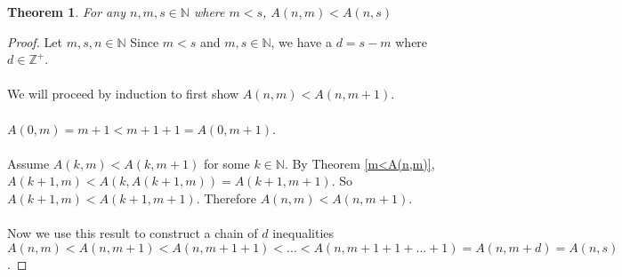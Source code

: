 \documentclass[12pt, letterpaper]{article}
\newtheorem{theorem}{Theorem}
\theoremstyle{case}
\begin{document}
    \begin{theorem}
      \label{a(n,m)<a(n,s)}
      For any $n, m, s \in \mathbb{N}$ where $m < s$, $A(n, m) < A(n, s)$
    \end{theorem}
    \begin{proof}
      Let $m, s, n \in \mathbb{N}$
      Since $m < s$ and $m, s \in \mathbb{N}$, we have a $d = s - m$ where $d \in \mathbb{Z}^+$.
      \\
      \\
      We will proceed by induction to first show $A(n, m) < A(n, m + 1)$.
      \\
      \\
      $A(0, m) = m + 1 < m + 1 + 1 = A(0, m + 1)$.
      \\
      \\
      Assume $A(k, m) < A(k, m + 1)$ for some $k \in \mathbb{N}$.
      By Theorem \ref{m<A(n,m)}, $A(k + 1, m) < A(k, A(k + 1, m)) = A(k + 1, m + 1)$.
      So $A(k + 1, m) < A(k + 1, m + 1)$.
      Therefore $A(n, m) < A(n, m + 1)$.
      \\
      \\
      Now we use this result to construct a chain of $d$ inequalities $A(n, m) < A(n, m + 1) < A(n, m + 1 + 1) < ... < A(n, m + 1 + 1 + ... + 1)
      = A(n, m + d) = A(n, s)$. 
    \end{proof}

\end{document}
